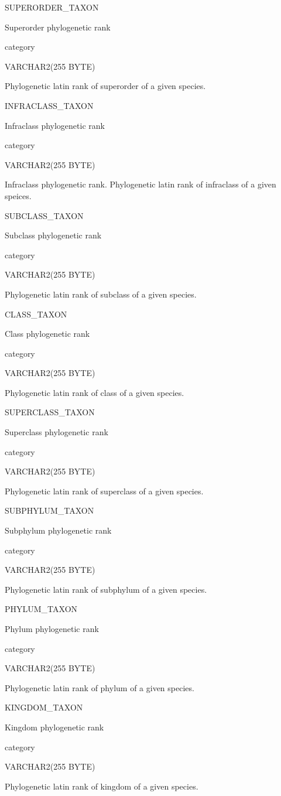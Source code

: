 \documentclass[
  letterpaper,
  oneside,
  open=any]{scrbook}
\begin{document}
SUPERORDER\_TAXON

Superorder phylogenetic rank

category

VARCHAR2(255 BYTE)

Phylogenetic latin rank of superorder of a given species.

INFRACLASS\_TAXON

Infraclass phylogenetic rank

category

VARCHAR2(255 BYTE)

Infraclass phylogenetic rank. Phylogenetic latin rank of infraclass of a
given speices.

SUBCLASS\_TAXON

Subclass phylogenetic rank

category

VARCHAR2(255 BYTE)

Phylogenetic latin rank of subclass of a given species.

CLASS\_TAXON

Class phylogenetic rank

category

VARCHAR2(255 BYTE)

Phylogenetic latin rank of class of a given species.

SUPERCLASS\_TAXON

Superclass phylogenetic rank

category

VARCHAR2(255 BYTE)

Phylogenetic latin rank of superclass of a given species.

SUBPHYLUM\_TAXON

Subphylum phylogenetic rank

category

VARCHAR2(255 BYTE)

Phylogenetic latin rank of subphylum of a given species.

PHYLUM\_TAXON

Phylum phylogenetic rank

category

VARCHAR2(255 BYTE)

Phylogenetic latin rank of phylum of a given species.

KINGDOM\_TAXON

Kingdom phylogenetic rank

category

VARCHAR2(255 BYTE)

Phylogenetic latin rank of kingdom of a given species.
\end{document}
